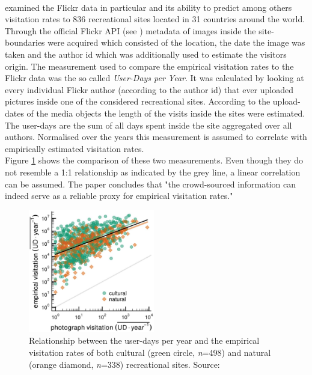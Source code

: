 \paragraph*{\textcite{Wood2013}} examined the Flickr data in particular and its ability to predict among others visitation rates to 836 recreational sites located in 31 countries around the world. Through the official Flickr API (see ) metadata of images inside the site-boundaries were acquired which consisted of the location, the date the image was taken and the author id which was additionally used to estimate the visitors origin. The measurement used to compare the empirical visitation rates to the Flickr data was the so called \textit{User-Days per Year}. It was calculated by looking at every individual Flickr author (according to the author id) that ever uploaded pictures inside one of the considered recreational sites. According to the upload-dates of the media objects the length of the visits inside the sites were estimated. The user-days are the sum of all days spent inside the site aggregated over all authors. Normalised over the years this measurement is assumed to correlate with empirically estimated visitation rates. \\
Figure \ref{fig:wood_user_days} shows the comparison of these two measurements. Even though they do not resemble a 1:1 relationship as indicated by the grey line, a linear correlation can be assumed. The paper concludes that "the crowd-sourced information can indeed serve as a reliable proxy for empirical visitation rates." \parencite[p.1]{Wood2013}

\begin{figure}[h]
   \begin{center}
   \includegraphics[width=0.49\textwidth]{img/wood_user_photodays.pdf}
   \end{center}
   \caption{Relationship between the user-days per year and the empirical visitation rates of both cultural (green circle, \textit{n}=498) and natural (orange diamond, \textit{n}=338) recreational sites. Source: \textcite[p.4]{Wood2013}}
   \label{fig:wood_user_days}
\end{figure}

